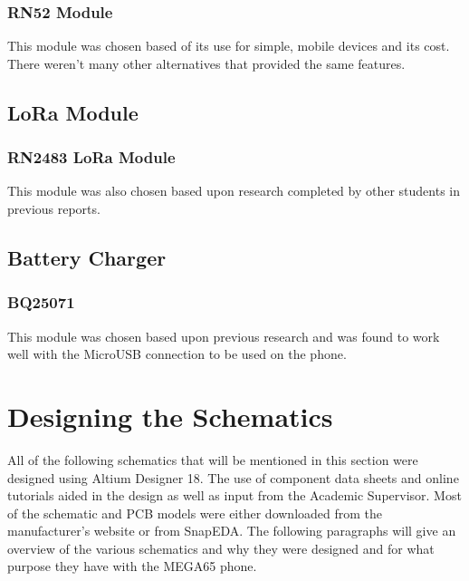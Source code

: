 \subsubsection{RN52 Module}
	This module was chosen based of its use for simple, mobile devices and its cost. 
There weren't many other alternatives that provided the same features. 


\subsection{LoRa Module}
\subsubsection{RN2483 LoRa Module}
	This module was also chosen based upon research completed by other students in previous reports.


\subsection{Battery Charger}
\subsubsection{BQ25071}
	This module was chosen based upon previous research and was found to work well with the MicroUSB connection to be used on the phone. 
		

\section{Designing the Schematics}
\label{chap5sec2}

	All of the following schematics that will be mentioned in this section were designed using Altium Designer 18. 
The use of component data sheets and online tutorials aided in the design as well as input from the Academic Supervisor. 
Most of the schematic and PCB models were either downloaded from the manufacturer's website or from SnapEDA. 
The following paragraphs will give an overview of the various schematics and why they were designed and for what purpose they have with the MEGA65 phone.

